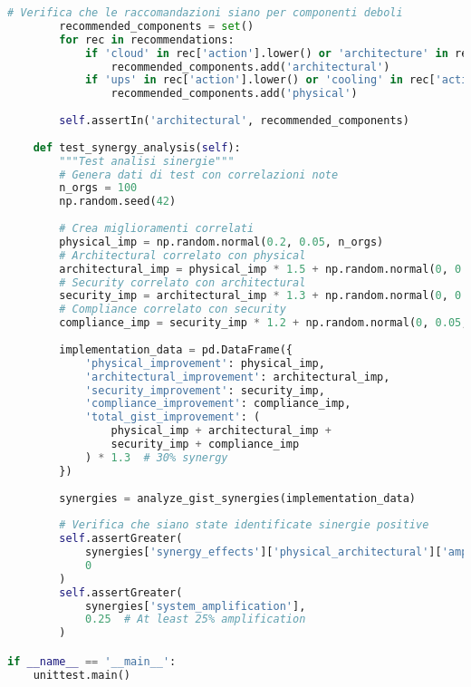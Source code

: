\begin{lstlisting}[language=Python, caption=Suite di Test per Framework GIST]
        # Verifica che le raccomandazioni siano per componenti deboli
        recommended_components = set()
        for rec in recommendations:
            if 'cloud' in rec['action'].lower() or 'architecture' in rec['action'].lower():
                recommended_components.add('architectural')
            if 'ups' in rec['action'].lower() or 'cooling' in rec['action'].lower():
                recommended_components.add('physical')
        
        self.assertIn('architectural', recommended_components)
    
    def test_synergy_analysis(self):
        """Test analisi sinergie"""
        # Genera dati di test con correlazioni note
        n_orgs = 100
        np.random.seed(42)
        
        # Crea miglioramenti correlati
        physical_imp = np.random.normal(0.2, 0.05, n_orgs)
        # Architectural correlato con physical
        architectural_imp = physical_imp * 1.5 + np.random.normal(0, 0.05, n_orgs)
        # Security correlato con architectural
        security_imp = architectural_imp * 1.3 + np.random.normal(0, 0.05, n_orgs)
        # Compliance correlato con security
        compliance_imp = security_imp * 1.2 + np.random.normal(0, 0.05, n_orgs)
        
        implementation_data = pd.DataFrame({
            'physical_improvement': physical_imp,
            'architectural_improvement': architectural_imp,
            'security_improvement': security_imp,
            'compliance_improvement': compliance_imp,
            'total_gist_improvement': (
                physical_imp + architectural_imp + 
                security_imp + compliance_imp
            ) * 1.3  # 30% synergy
        })
        
        synergies = analyze_gist_synergies(implementation_data)
        
        # Verifica che siano state identificate sinergie positive
        self.assertGreater(
            synergies['synergy_effects']['physical_architectural']['amplification'],
            0
        )
        self.assertGreater(
            synergies['system_amplification'],
            0.25  # At least 25% amplification
        )

if __name__ == '__main__':
    unittest.main()
\end{lstlisting}